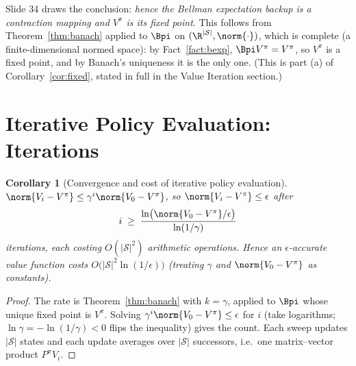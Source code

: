 \documentclass[11pt,a4paper]{article}
\newcommand{\cS}{\mathcal{S}}
\theoremstyle{plain}
\newtheorem{corollary}[theorem]{Corollary}
\theoremstyle{definition}
\theoremstyle{remark}
\begin{document}
Slide 34 draws the conclusion: \emph{hence the Bellman expectation backup is a contraction mapping and $V^\pi$ is its fixed point}. This follows from Theorem~\ref{thm:banach} applied to $\Bpi$ on $(\R^{|\cS|},\norm{\cdot})$, which is complete (a finite-dimensional normed space): by Fact~\ref{fact:bexp}, $\Bpi V^\pi=V^\pi$, so $V^\pi$ is a fixed point, and by Banach's uniqueness it is the only one. (This is part (a) of Corollary~\ref{cor:fixed}, stated in full in the Value Iteration section.)

\section{Iterative Policy Evaluation: Iterations }\label{sec:peiters}
\begin{corollary}[Convergence and cost of iterative policy evaluation]\label{cor:pe}
$\norm{V_i-V^\pi}\le\gamma^i\norm{V_0-V^\pi}$, so $\norm{V_i-V^\pi}\le\epsilon$ after
\[
i\;\ge\;\frac{\ln\!\big(\norm{V_0-V^\pi}/\epsilon\big)}{\ln(1/\gamma)}
\]
iterations, each costing $O(|\cS|^2)$ arithmetic operations. Hence an $\epsilon$-accurate value function costs $O\big(|\cS|^2\ln(1/\epsilon)\big)$ (treating $\gamma$ and $\norm{V_0-V^\pi}$ as constants).
\end{corollary}
\begin{proof}
The rate is Theorem~\ref{thm:banach} with $k=\gamma$, applied to $\Bpi$ whose unique fixed point is $V^\pi$. Solving $\gamma^i\norm{V_0-V^\pi}\le\epsilon$ for $i$ (take logarithms; $\ln\gamma=-\ln(1/\gamma)<0$ flips the inequality) gives the count. Each sweep updates $|\cS|$ states and each update averages over $|\cS|$ successors, i.e.\ one matrix--vector product $P^\pi V_i$.
\end{proof}
\end{document}
